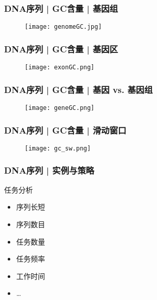 \begin{frame}
  \frametitle{DNA序列 | GC含量 | 基因组}
  \begin{figure}
    \centering
    \texttt{[image: genomeGC.jpg]}
  \end{figure}
\end{frame}

\begin{frame}
  \frametitle{DNA序列 | GC含量 | 基因区}
  \begin{figure}
    \centering
    \texttt{[image: exonGC.png]}
  \end{figure}
\end{frame}

\begin{frame}
  \frametitle{DNA序列 | GC含量 | 基因 vs. 基因组}
  \begin{figure}
    \centering
    \texttt{[image: geneGC.png]}
  \end{figure}
\end{frame}

\begin{frame}
  \frametitle{DNA序列 | GC含量 | 滑动窗口}
  \begin{figure}
    \centering
    \texttt{[image: gc\_sw.png]}
  \end{figure}
\end{frame}

\begin{frame}
  \frametitle{DNA序列 | \alert{实例与策略}}
  \pause
  \begin{block}{任务分析}
    \begin{itemize}
      \item 序列长短
      \item 序列数目
      \item 任务数量
      \item 任务频率
      \item 工作时间
      \item \ldots
    \end{itemize}
  \end{block}
\end{frame}

